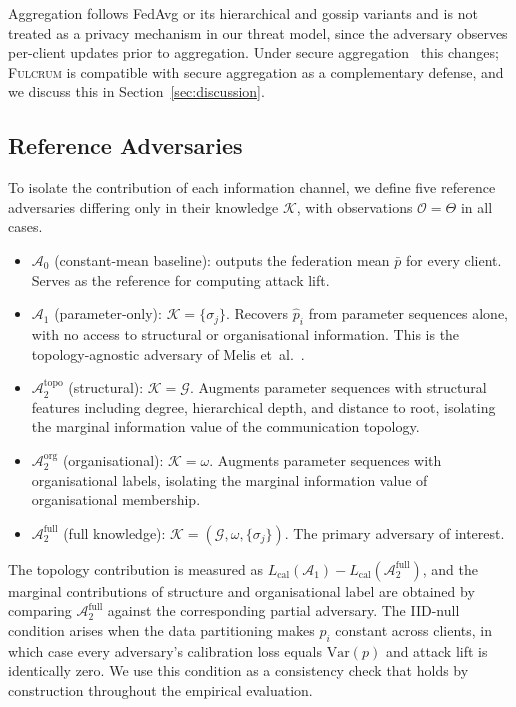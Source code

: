 \documentclass[letterpaper,journal]{IEEEtran}
\newcommand{\Fulcrum}{\textsc{Fulcrum}\xspace}
\begin{document}
\noindent Aggregation follows FedAvg or its hierarchical and gossip variants
and is not treated as a privacy mechanism in our threat model, since
the adversary observes per-client updates prior to aggregation. Under
secure aggregation~\cite{bonawitz2017secagg} this changes; \Fulcrum
is compatible with secure aggregation as a complementary defense, and
we discuss this in Section~\ref{sec:discussion}.

\subsection{Reference Adversaries}
\label{sec:reference-adv}

To isolate the contribution of each information channel, we define
five reference adversaries differing only in their knowledge
$\mathcal{K}$, with observations $\mathcal{O} = \Theta$ in all cases.

\begin{itemize}[topsep=2pt,itemsep=2pt,leftmargin=*]
\item $\mathcal{A}_0$ (constant-mean baseline): outputs the federation
  mean $\bar{p}$ for every client. Serves as the reference for
  computing attack lift.
\item $\mathcal{A}_1$ (parameter-only): $\mathcal{K} = \{\sigma_j\}$.
  Recovers $\hat{p}_i$ from parameter sequences alone, with no access
  to structural or organisational information. This is the
  topology-agnostic adversary of Melis et~al.~\cite{melis2019exploiting}.
\item $\mathcal{A}_2^{\text{topo}}$ (structural): $\mathcal{K} =
  \mathcal{G}$. Augments parameter sequences with structural features
  including degree, hierarchical depth, and distance to root,
  isolating the marginal information value of the communication
  topology.
\item $\mathcal{A}_2^{\text{org}}$ (organisational): $\mathcal{K} =
  \omega$. Augments parameter sequences with organisational labels,
  isolating the marginal information value of organisational
  membership.
\item $\mathcal{A}_2^{\text{full}}$ (full knowledge): $\mathcal{K} =
  (\mathcal{G}, \omega, \{\sigma_j\})$. The primary adversary of
  interest.\medskip
\end{itemize}

The topology contribution is measured as
$L_{\text{cal}}(\mathcal{A}_1) - L_{\text{cal}}(\mathcal{A}_2^{\text{full}})$,
and the marginal contributions of structure and organisational label
are obtained by comparing $\mathcal{A}_2^{\text{full}}$ against the
corresponding partial adversary. The IID-null condition arises when
the data partitioning makes $p_i$ constant across clients, in which
case every adversary's calibration loss equals $\mathrm{Var}(p)$ and
attack lift is identically zero. We use this condition as a consistency check that holds by construction throughout the empirical evaluation.
\end{document}
